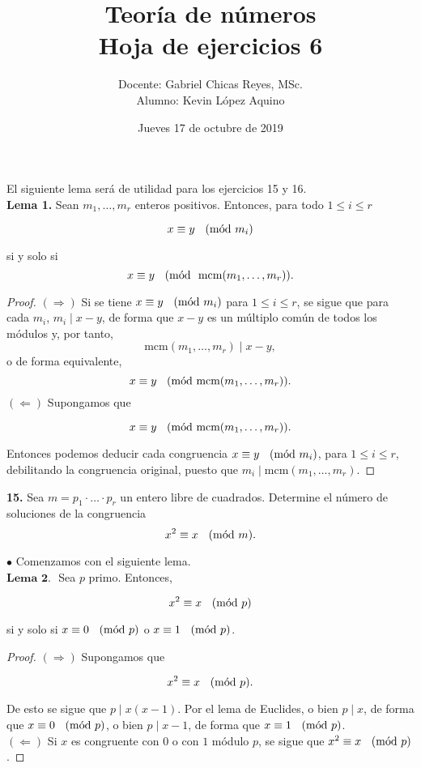 \documentclass{article}
\newcommand{\Mod}[1]{\ \hspace{0.2cm} (\mathrm{m\acute{o}d}\ #1)}
\begin{document}
\date{Jueves 17 de octubre de 2019}
\title{ \textbf{Teoría de números } \\
Hoja de ejercicios 6 }
\author{Docente: Gabriel Chicas Reyes, MSc.\\ 
				Alumno: Kevin López Aquino }
\maketitle	

El siguiente lema será de utilidad para los ejercicios 15 y 16.  \\

\textbf{Lema 1. } Sean $m_{1} , \ldots , m_{r}$ enteros positivos. Entonces, para todo $1 \leq i \leq r$

$$ x \equiv y \Mod{m_{i}} $$

si y solo si $$ x \equiv y \Mod{ \text{ mcm} (m_{1}, \ldots, m_{r} ) }. $$
\begin{proof}
	$(\Rightarrow)$ Si se tiene $x \equiv y \Mod{m_{i}}$ para $1 \leq i \leq r$, se sigue que para cada $m_{i}$, $m_{i} \mid x - y$, de forma que $x - y$ es un múltiplo común de todos los módulos y, por tanto,
	$$ \text{mcm}(m_{1}, \ldots , m_{r}) \mid x - y, $$
	o de forma equivalente, 
	$$ x \equiv y \Mod{\text{mcm}(m_{1}, \ldots , m_{r})}. $$
$(\Leftarrow)$ Supongamos que 

$$ x \equiv y \Mod{\text{mcm}(m_{1}, \ldots , m_{r})}. $$

Entonces podemos deducir cada congruencia $x \equiv y \Mod{m_{i}}$, para $1 \leq i \leq r$, debilitando la congruencia original, puesto que $m_{i} \mid \text{mcm}(m_{1}, \ldots , m_{r}).$

\end{proof}

\newpage

\begin{mybox}
	\textbf{15. } Sea $m = p_{1} \cdot \ldots \cdot p_{r}$ un entero libre de cuadrados. Determine el número de soluciones de la congruencia
	$$ x^{2} \equiv x \Mod{m}. $$ 
\end{mybox}	

$\bullet$ Comenzamos con el siguiente lema. \\

$\textbf{Lema 2. }$ Sea $p$ primo. Entonces, 

$$ x^2 \equiv x \Mod{p}$$

 si y solo si $x \equiv 0 \Mod{p}$ o $x \equiv 1 \Mod{p}$. 
  \begin{proof}
 	$(\Rightarrow)$ Supongamos que 
 	
 	$$ x^2 \equiv x \Mod{p}.$$
 	
 	De esto se sigue que $p \mid x(x - 1)$. Por el lema de Euclides, o bien $p \mid x$, de forma que $x \equiv 0 \Mod{p}$, o bien $p \mid x -1$, de forma que $x \equiv 1 \Mod{p}$. \\
 	
 	$(\Leftarrow)$ Si $x$ es congruente con $0$ o con $1$ módulo $p$, se sigue que $x^{2} \equiv x \Mod{p}$.
 \end{proof}
\end{document}
